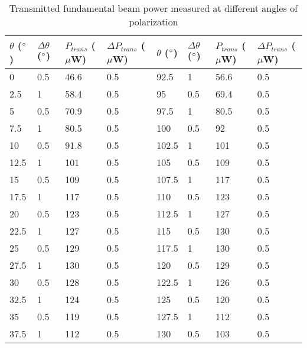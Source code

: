 \begin{table}[h!]
\centering
\caption{Transmitted fundamental beam power measured at different angles of polarization}
\label{tab:variabattcalib}
\begin{tabular}{|l|l|l|l||l|l|l|l|}
\hline
$\theta$ ($\degree$) & $\Delta \theta$ ($\degree$) & $P_{trans}$ ($\mu$W) & $\Delta P_{trans}$ ($\mu$W) & $\theta$ ($\degree$) & $\Delta \theta$ ($\degree$) & $P_{trans}$ ($\mu$W) & $\Delta P_{trans}$ ($\mu$W) \\ \hline
0     & 0.5         & 46.6    & 0.5     & 92.5  & 1           & 56.6    & 0.5     \\ \hline
2.5   & 1           & 58.4    & 0.5     & 95    & 0.5         & 69.4    & 0.5     \\ \hline
5     & 0.5         & 70.9    & 0.5     & 97.5  & 1           & 80.5    & 0.5     \\ \hline
7.5   & 1           & 80.5    & 0.5     & 100   & 0.5         & 92      & 0.5     \\ \hline
10    & 0.5         & 91.8    & 0.5     & 102.5 & 1           & 101     & 0.5     \\ \hline
12.5  & 1           & 101     & 0.5     & 105   & 0.5         & 109     & 0.5     \\ \hline
15    & 0.5         & 109     & 0.5     & 107.5 & 1           & 117     & 0.5     \\ \hline
17.5  & 1           & 117     & 0.5     & 110   & 0.5         & 123     & 0.5     \\ \hline
20    & 0.5         & 123     & 0.5     & 112.5 & 1           & 127     & 0.5     \\ \hline
22.5  & 1           & 127     & 0.5     & 115   & 0.5         & 130     & 0.5     \\ \hline
25    & 0.5         & 129     & 0.5     & 117.5 & 1           & 130     & 0.5     \\ \hline
27.5  & 1           & 130     & 0.5     & 120   & 0.5         & 129     & 0.5     \\ \hline
30    & 0.5         & 128     & 0.5     & 122.5 & 1           & 126     & 0.5     \\ \hline
32.5  & 1           & 124     & 0.5     & 125   & 0.5         & 120     & 0.5     \\ \hline
35    & 0.5         & 119     & 0.5     & 127.5 & 1           & 112     & 0.5     \\ \hline
37.5  & 1           & 112     & 0.5     & 130   & 0.5         & 103     & 0.5     \\ \hline

\end{tabular}
\end{table}
